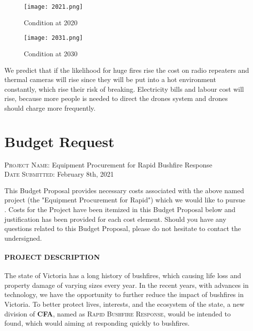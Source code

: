 \documentclass[13pt]{ctexart} %
\begin{document}
\begin {figure}[h]
\centering %
\texttt{[image: 2021.png]}
\caption{Condition at 2020} %
\end {figure}

\begin {figure}[h]
\centering %
\texttt{[image: 2031.png]}
\caption{Condition at 2030} %
\end {figure}

We predict that if the likelihood for huge fires rise the cost on radio repeaters and thermal cameras will rise since they will be put into a hot environment constantly, which rise their risk of breaking. Electricity bills and labour cost will rise, because more people is needed to direct the drones system and drones should charge more frequently.

\newpage
\thispagestyle{empty}
\section*{\centering \textbf{Budget Request}}
\vspace{10pt}
\begin{flushleft}
    {\small
    \noindent \textsc{Project Name}: Equipment Procurement for Rapid Bushfire Response
    \\ \noindent \textsc{Date Submitted}: February 8th, 2021}
\end{flushleft}
\vspace{10pt}
This Budget Proposal provides necessary costs associated with the above named project (the "Equipment Procurement for Rapid") which we would like to pursue . Costs for the Project have been itemized in this Budget Proposal below and justification has been provided for each cost element. Should you have any questions related to this Budget Proposal, please do not hesitate to contact the undersigned.
\paragraph{PROJECT DESCRIPTION\\} The state of Victoria has a long history of bushfires, which causing life loss and property damage of varying sizes every year. In the recent years, with advances in technology, we have the opportunity to further reduce the impact of bushfires in Victoria. To better protect lives, interests, and the ecosystem of the state, a new division of \textbf{CFA}, named as \textsc{Rapid Bushfire Response}, would be intended to found, which would aiming at responding quickly to bushfires.
\end{document}
